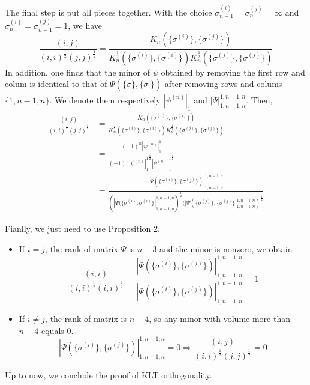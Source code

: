 \documentclass{beamer}
\begin{document}
\begin{frame}
    The final step is put all pieces together. With the choice  $\sigma_{n-1}^{(i)}=\sigma_n^{(j)}=\infty$ and $\sigma_n^{(i)}=\sigma_{n-1}^{(j)}=1$,
    we have 
    \begin{equation*}
        \frac{(i,j)}{(i,i)^{\frac12}(j,j)^{\frac12}}=\frac{K_n(\{\sigma^{(i)}\},\{\sigma^{(j)}\})}{K_n^{\frac12}(\{\sigma^{(i)}\},\{\sigma^{(i)}\})K_n^{\frac12}(\{\sigma^{(j)}\},\{\sigma^{(j)}\})}
    \end{equation*}
    In addition, one finds that the minor of $\psi$ obtained by removing the first row and colum is identical to 
    that of $\Psi(\{\sigma\},\{\sigma^{\prime}\})$ after removing rows and colums $\{1,n-1,n\}$. We denote them respectively
    $|\psi^{(n)}|^1_1$ and $|\Psi|^{1,n-1,n}_{1,n-1,n}$. Then,
    \begin{align*}
        \frac{(i,j)}{(i,i)^{\frac12}(j,j)^{\frac12}}&=\frac{K_n(\{\sigma^{(i)}\},\{\sigma^{(j)}\})}{K_n^{\frac12}(\{\sigma^{(i)}\},\{\sigma^{(i)}\})K_n^{\frac12}(\{\sigma^{(j)}\},\{\sigma^{(j)}\})}\\
        &=\frac{(-1)^n|\psi^{(n)}|^1_1}{{(-1)^n|\psi^{(n)}|^1_1}^{\frac{1}{2}}{|\psi^{(n)}|^1_1}^{\frac{1}{2}}}\\
        &=\frac{|\Psi(\{\sigma^{(i)}\},\{\sigma^{(j)}\})|_{1,n-1,n}^{1,n-1,n}}{(|\Psi(\{\sigma^{(i)},\sigma^{(i)}\}|_{1,n-1,n}^{1,n-1,n})^{\frac12}(|\Psi(\{\sigma^{(j)}\},\{\sigma^{(j)}\}|_{1,n-1,n}^{1,n-1,n})^{\frac12}}
    \end{align*}
\end{frame}
\begin{frame}
    Fianlly, we just need to use Proposition 2. 
    \begin{itemize}
        \item If $i=j$, the rank of matrix $\Psi$ is $n-3$ and the minor is nonzero, we obtain
        \begin{equation*}
            \frac{(i,i)}{(i,i)^{\frac12}(i,i)^{\frac12}}=\frac{|\Psi(\{\sigma^{(i)}\},\{\sigma^{(j)}\})|_{1,n-1,n}^{1,n-1,n}}{|\Psi(\{\sigma^{(i)}\},\{\sigma^{(j)}\})|_{1,n-1,n}^{1,n-1,n}}=1
        \end{equation*}
        \item If $i\neq j$, the rank of matrix is $n-4$, so any minor with volume more than $n-4$ equals 0.
        \begin{equation*}
            |\Psi(\{\sigma^{(i)}\},\{\sigma^{(j)}\})|_{1,n-1,n}^{1,n-1,n}=0\Rightarrow \frac{(i,j)}{(i,i)^{\frac12}(j,j)^{\frac12}}=0
        \end{equation*}
    \end{itemize}
    Up to now, we conclude the proof of KLT orthogonality.
\end{frame}
\end{document}
